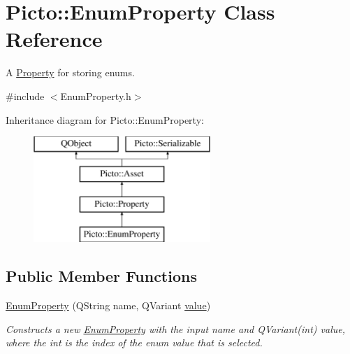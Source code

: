 \hypertarget{class_picto_1_1_enum_property}{\section{Picto\-:\-:Enum\-Property Class Reference}
\label{class_picto_1_1_enum_property}
}


A \hyperlink{class_picto_1_1_property}{Property} for storing enums.  




{\ttfamily \#include $<$Enum\-Property.\-h$>$}

Inheritance diagram for Picto\-:\-:Enum\-Property\-:\begin{figure}[H]
\begin{center}
\leavevmode
\includegraphics[height=4.000000cm]{class_picto_1_1_enum_property}
\end{center}
\end{figure}
\subsection*{Public Member Functions}
\begin{DoxyCompactItemize}
\item 
\hypertarget{class_picto_1_1_enum_property_a71c4b63abb29460dbe117b88e0949f49}{\hyperlink{class_picto_1_1_enum_property_a71c4b63abb29460dbe117b88e0949f49}{Enum\-Property} (Q\-String name, Q\-Variant \hyperlink{class_picto_1_1_property_a69540c9d4f9a4b0b128b4c6a876d67ca}{value})}\label{class_picto_1_1_enum_property_a71c4b63abb29460dbe117b88e0949f49}

\begin{DoxyCompactList}\small\item\em Constructs a new \hyperlink{class_picto_1_1_enum_property}{Enum\-Property} with the input name and Q\-Variant(int) value, where the int is the index of the enum value that is selected. \end{DoxyCompactList}\end{DoxyCompactItemize}
